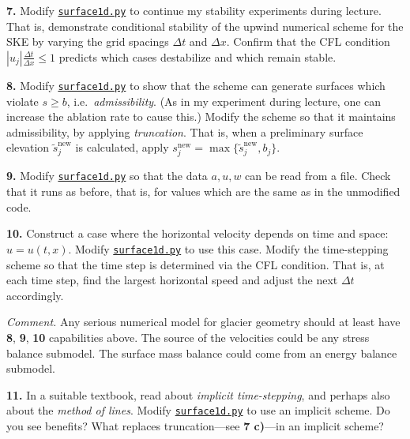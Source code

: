 \documentclass[12pt]{amsart}
\newcommand{\prob}[1]{\bigskip\noindent\textbf{#1.}\quad }
\begin{document}
\prob{7}  Modify \href{https://github.com/bueler/mccarthy/blob/master/py/surface1d.py}{\texttt{surface1d.py}} to continue my stability experiments during lecture.  That is, demonstrate conditional stability of the upwind numerical scheme for the SKE by varying the grid spacings $\Delta t$ and $\Delta x$.  Confirm that the CFL condition $|u_j| \frac{\Delta t}{\Delta x} \le 1$ predicts which cases destabilize and which remain stable.

\prob{8}  Modify \href{https://github.com/bueler/mccarthy/blob/master/py/surface1d.py}{\texttt{surface1d.py}} to show that the scheme can generate surfaces which violate $s\ge b$, i.e.~\emph{admissibility}.  (As in my experiment during lecture, one can increase the ablation rate to cause this.)  Modify the scheme so that it maintains admissibility, by applying \emph{truncation}.  That is, when a preliminary surface elevation ${\tilde s}_j^{\text{new}}$ is calculated, apply $s_j^{\text{new}} = \max\{{\tilde s}_j^{\text{new}},b_j\}$.

\prob{9}  Modify \href{https://github.com/bueler/mccarthy/blob/master/py/surface1d.py}{\texttt{surface1d.py}} so that the data $a,u,w$ can be read from a file.  Check that it runs as before, that is, for values which are the same as in the unmodified code.

\prob{10}  Construct a case where the horizontal velocity depends on time and space: $u=u(t,x)$.  Modify \href{https://github.com/bueler/mccarthy/blob/master/py/surface1d.py}{\texttt{surface1d.py}} to use this case.  Modify the time-stepping scheme so that the time step is determined via the CFL condition.  That is, at each time step, find the largest horizontal speed and adjust the next $\Delta t$ accordingly.

\medskip

\smallskip
\noindent \emph{Comment.}  Any serious numerical model for glacier geometry should at least have \textbf{8}, \textbf{9}, \textbf{10} capabilities above.  The source of the velocities could be any stress balance submodel.  The surface mass balance could come from an energy balance submodel.

\smallskip
\prob{11}  In a suitable textbook, read about \emph{implicit time-stepping}, and perhaps also about the \emph{method of lines}.  Modify \href{https://github.com/bueler/mccarthy/blob/master/py/surface1d.py}{\texttt{surface1d.py}} to use an implicit scheme.  Do you see benefits?  What replaces truncation---see \textbf{7 c)}---in an implicit scheme?
\end{document}
